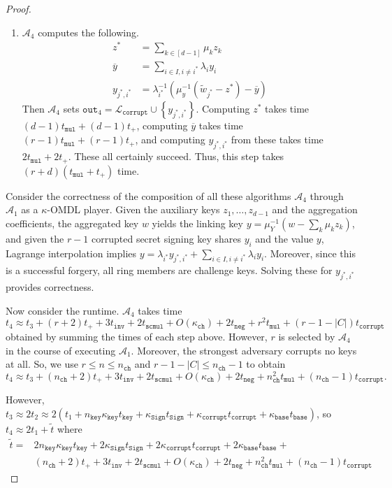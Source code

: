 \documentclass[11pt]{article}
\theoremstyle{definition}
\newcommand{\sign}{\texttt{Sign}}
\begin{document}
\begin{proof}
\begin{enumerate}
\item $\mathcal{A}_4$ computes the following.
\begin{align*}
z^* &= \sum_{k \in [d-1]} \mu_k z_k \\
\overline{y} &= \sum_{i \in I, i \neq i^*} \lambda_i y_i \\
y_{j^*,i^*} &= \lambda_{i^*}^{-1}\left(\mu_y^{-1}\left(\widetilde{w}_{j^*} - z^*\right) - \overline{y}\right)
\end{align*} Then $\mathcal{A}_4$ sets $\texttt{out}_4 = \mathcal{L}_{\texttt{corrupt}} \cup \left\{y_{j^*, i^*}\right\}$.
Computing $z^*$ takes time $(d-1)t_{\texttt{mul}} + (d-1)t_{+}$, computing $\overline{y}$ takes time $(r-1)t_{\texttt{mul}} + (r-1)t_{+}$, and computing $y_{j^*,i^*}$ from these takes time $2t_{\texttt{mul}} + 2t_{+}$. These all certainly succeed. Thus, this step takes $(r+d)(t_{\texttt{mul}} + t_+)$ time.
\end{enumerate}

Consider the correctness of the composition of all these algorithms $\mathcal{A}_4$ through $\mathcal{A}_1$ as a $\kappa$-OMDL player. Given the auxiliary keys $z_1, \ldots, z_{d-1}$ and the aggregation coefficients, the aggregated key $w$ yields the linking key $y=\mu_Y^{-1}(w-\sum_k \mu_k z_k)$, and given the $r-1$ corrupted secret signing key shares $y_i$ and the value $y$, Lagrange interpolation implies $y = \lambda_{i^*} y_{j^*,i^*} + \sum_{i \in I, i \neq i^*} \lambda_i y_{i}$. Moreover, since this is a successful forgery, all ring members are challenge keys. Solving these for $y_{j^*,i^*}$ provides correctness.

Now consider the runtime. $\mathcal{A}_4$ takes time \[t_4 \approx t_3 + (r+2)t_{+} + 3t_{\texttt{inv}} + 2t_{\texttt{scmul}} + O(\kappa_{\texttt{ch}}) + 2t_{\texttt{neg}} + r^2t_{\texttt{mul}} + (r-1-\left|C\right|)t_{\texttt{corrupt}}\] obtained by summing the times of each step above. However, $r$ is selected by $\mathcal{A}_4$ in the course of executing $\mathcal{A}_1$. Moreover, the strongest adversary corrupts no keys at all. So, we use $r \leq n \leq n_{\texttt{ch}}$ and $r-1-\left|C\right| \leq n_{\texttt{ch}}-1$ to obtain \[t_4 \approx t_3 + (n_{\texttt{ch}}+2)t_{+} + 3t_{\texttt{inv}} + 2t_{\texttt{scmul}} + O(\kappa_{\texttt{ch}}) + 2t_{\texttt{neg}} + n_{\texttt{ch}}^2t_{\texttt{mul}} + (n_{\texttt{ch}}-1)t_{\texttt{corrupt}}.\] 

However, $t_3 \approx 2t_2 \approx 2(t_1 + n_{\texttt{key}}\kappa_{\texttt{key}}t_{\texttt{key}} + \kappa_{\sign}t_{\sign} + \kappa_{\texttt{corrupt}}t_{\texttt{corrupt}} + \kappa_{\texttt{base}} t_{\texttt{base}})$, so $t_4 \approx 2t_1 + \widetilde{t}$ where
\begin{align*}
\widetilde{t} =& 2n_{\texttt{key}}\kappa_{\texttt{key}}t_{\texttt{key}} + 2\kappa_\sign t_\sign + 2\kappa_{\texttt{corrupt}}t_{\texttt{corrupt}} + 2\kappa_{\texttt{base}}t_{\texttt{base}} + \\
& (n_{\texttt{ch}}+2)t_{+} + 3t_{\texttt{inv}} + 2t_{\texttt{scmul}} + O(\kappa_{\texttt{ch}}) + 2t_{\texttt{neg}} + n_{\texttt{ch}}^2t_{\texttt{mul}} + (n_{\texttt{ch}}-1)t_{\texttt{corrupt}}
\end{align*}


\end{proof}
\end{document}
